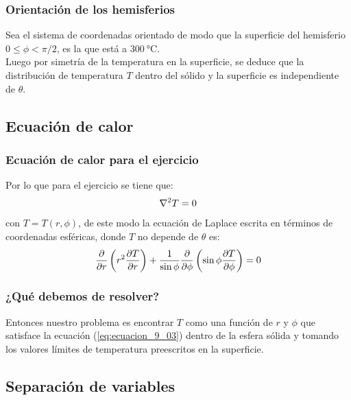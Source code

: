 \documentclass[12pt]{beamer}
\begin{document}
\begin{frame}
\frametitle{Orientación de los hemisferios}
Sea el sistema de coordenadas orientado de modo que la superficie del hemisferio $0 \leq \phi < \pi/2$, es la que está a $\SI{300}{\degreeCelsius}$.
\\
\bigskip
\pause
Luego por simetría de la temperatura en la superficie, se deduce que la distribución de temperatura $T$ dentro del sólido y la superficie es independiente de $\theta$.
\end{frame}

\subsection{Ecuación de calor}

\begin{frame}
\frametitle{Ecuación de calor para el ejercicio}
Por lo que para el ejercicio se tiene que:
\pause
\begin{align}
\laplacian{T} = 0
\label{eq:ecuacion_9_02}
\end{align}
con $T = T(r, \phi)$, de este modo la ecuación de Laplace escrita en términos de coordenadas esféricas, donde $T$ no depende de $\theta$ es:
\pause
\begin{align}
\pdv{r} \left( r^{2} \pdv{T}{r} \right) + \dfrac{1}{\sin \phi} \pdv{\phi} \left( \sin \phi \pdv{T}{\phi} \right) = 0
\label{eq:ecuacion_9_03}
\end{align}
\end{frame}
\begin{frame}
\frametitle{¿Qué debemos de resolver?}
Entonces nuestro problema es encontrar $T$ como una función de $r$ y $\phi$ que satisface la ecuación (\ref{eq:ecuacion_9_03}) dentro de la esfera sólida y tomando los valores límites de temperatura preescritos en la superficie.
\end{frame}

\subsection{Separación de variables}
\end{document}
